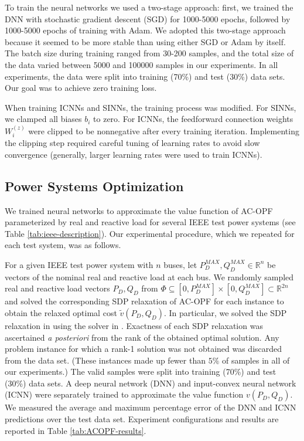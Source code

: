 \documentclass[10pt]{article} %
\theoremstyle{plain}
\theoremstyle{definition}
\theoremstyle{remark}
\begin{document}
To train the neural networks we used a two-stage approach: first, we trained the DNN with stochastic gradient descent (SGD) for 1000-5000 epochs, followed by 1000-5000 epochs of training with Adam. We adopted this two-stage approach because it seemed to be more stable than using either SGD or Adam by itself. 
The batch size during training ranged from 30-200 samples, and the total size of the data varied between 5000 and 100000 samples in our experiments. 
In all experiments, the data were split into training (70\%) and test (30\%) data sets.
Our goal was to achieve zero training loss.

When training ICNNs and SINNs, the training process was modified. For SINNs, we clamped all biases $b_i$ to zero. For ICNNs, the feedforward connection weights $W^{(z)}_i$ were clipped to be nonnegative after every training iteration. Implementing the clipping step required careful tuning of learning rates to avoid slow convergence (generally, larger learning rates were used to train ICNNs).

\subsection{Power Systems Optimization}


We trained neural networks to approximate the value function of AC-OPF parameterized by real and reactive load for several IEEE test power systems (see Table \ref{tab:ieee-description}). Our experimental procedure, which we repeated for each test system, was as follows.

For a given IEEE test power system with $n$ buses, let $P^{MAX}_D, Q^{MAX}_D \in \mathbb{R}^n$ be vectors of the nominal real and reactive load at each bus. We randomly sampled real and reactive load vectors $P_D, Q_D$ from $\Phi \subseteq [0, P^{MAX}_D] \times [0, Q^{MAX}_D] \subset \mathbb{R}^{2n}$ and solved the corresponding SDP relaxation of AC-OPF for each instance to obtain the relaxed optimal cost $\tilde{v}(P_D, Q_D)$. In particular, we solved the SDP relaxation in \citet{lavaei2012zero} using the solver in \citet{madani2014sdp}. Exactness of each SDP relaxation was ascertained \textit{a posteriori} from the rank of the obtained optimal solution. Any problem instance for which a rank-1 solution was not obtained was discarded from the data set. (These instances made up fewer than $5\%$ of samples in all of our experiments.) The valid samples were split into training (70\%) and test (30\%) data sets. A deep neural network (DNN) and input-convex neural network (ICNN) were separately trained to approximate the value function $v(P_D, Q_D)$. We measured the average and maximum percentage error of the DNN and ICNN predictions over the test data set. 
Experiment configurations and results are reported in Table \ref{tab:ACOPF-results}.
\end{document}
